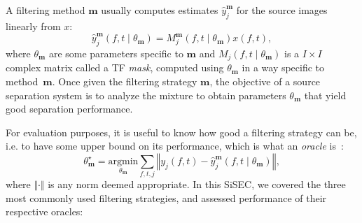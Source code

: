 \documentclass{article}
\newcommand{\sboxed}[1]{\textbf{#1}}
\newcommand{\thet}[1]{\theta_{\sboxed{#1}}}
\newcommand{\ft}{\left(f,t\right)}
\newcommand{\ftt}[1]{\left(f,t\mid\thet{#1}\right)}
\begin{document}
A filtering method $\sboxed{m}$ usually computes estimates $\hat{y}_j^{\sboxed{m}}$ for the source images linearly from $x$:
\begin{equation}
  \hat{y}_j^{\sboxed{m}}\ftt{m}=M_j^{\sboxed{m}}\ftt{m} x\ft,\label{eq:TFmask}
\end{equation}
where $\thet{m}$ are some parameters specific to $\sboxed{m}$ and $M_j\ftt{m}$ is a $I\times I$ complex matrix called a TF \textit{mask}, computed using $\thet{m}$ in a way specific to method~$\sboxed{m}$. Once given the filtering strategy $\sboxed{m}$, the objective of a source separation system is to analyze the mixture to obtain parameters $\thet{m}$ that yield good separation performance.

For evaluation purposes, it is useful to know how good a filtering strategy can be, i.e. to have some upper bound on its performance, which is what an \textit{oracle} is~\cite{vincent2007oracle}:
\begin{equation}
  \thet{m}^{\star}=\underset{\thet{m}}{\text{argmin}}\sum_{f,t,j}\left\Vert y_{j}\ft-\hat{y}_{j}^{\sboxed{m}}\ftt{m}\right\Vert,
  \end{equation}
where $\Vert\cdot\Vert$ is any norm deemed appropriate. In this SiSEC, we covered the three most commonly used filtering strategies, and assessed performance of their respective oracles:
\end{document}
